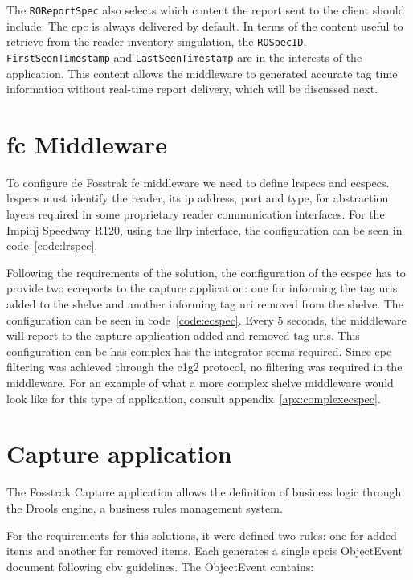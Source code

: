 The \texttt{ROReportSpec} also selects which content the report sent to the client should include.
The \ac{epc} is always delivered by default.
In terms of the content useful to retrieve from the reader inventory singulation, the \texttt{ROSpecID}, \texttt{FirstSeenTimestamp} and \texttt{LastSeenTimestamp} are in the interests of the application. 
This content allows the middleware to generated accurate tag time information without real-time report delivery, which will be discussed next.

\section{\acs{fc} Middleware}

To configure de Fosstrak \ac{fc} middleware we need to define \acp{lrspec} and \acp{ecspec}.
\acp{lrspec} must identify the reader, its \ac{ip} address, port and type, for abstraction layers required in some proprietary reader communication interfaces.
For the Impinj Speedway R120, using the \ac{llrp} interface, the configuration can be seen in code~\ref{code:lrspec}.

Following the requirements of the solution, the configuration of the \ac{ecspec} has to provide two \acp{ecreport} to the capture application: one for informing the tag \acp{uri} added to the shelve and another informing tag \ac{uri} removed from the shelve.
The configuration can be seen in code~\ref{code:ecspec}.
Every $5$ seconds, the middleware will report to the capture application added and removed tag \acp{uri}.
This configuration can be has complex has the integrator seems required. Since \ac{epc} filtering was achieved through the \ac{c1g2} protocol, no filtering was required in the middleware. For an example of what a more complex shelve middleware would look like for this type of application, consult appendix~\ref{apx:complexecspec}.

\section{Capture application}

The Fosstrak Capture application allows the definition of business logic through the Drools engine, a business rules management system.

For the requirements for this solutions, it were defined two rules: one for added items and another for removed items. Each generates a single \ac{epcis} ObjectEvent document following \ac{cbv} guidelines. The ObjectEvent contains:

